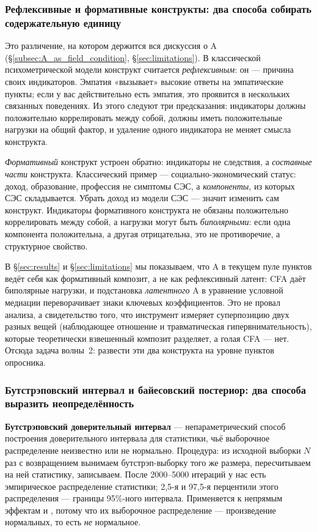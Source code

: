 \subsubsection{Рефлексивные и формативные конструкты: два способа собирать содержательную единицу}

Это различение, на котором держится вся дискуссия о A (§\ref{subsec:A_as_field_condition}, §\ref{sec:limitations}). В классической психометрической модели конструкт считается \emph{рефлексивным}: он --- причина своих индикаторов. Эмпатия «вызывает» высокие ответы на эмпатические пункты; если у вас действительно есть эмпатия, это проявится в нескольких связанных поведениях. Из этого следуют три предсказания: индикаторы должны положительно коррелировать между собой, должны иметь положительные нагрузки на общий фактор, и удаление одного индикатора не меняет смысла конструкта.

\emph{Формативный} конструкт устроен обратно: индикаторы не следствия, а \emph{составные части} конструкта. Классический пример --- социально-экономический статус: доход, образование, профессия не симптомы СЭС, а \emph{компоненты}, из которых СЭС складывается. Убрать доход из модели СЭС --- значит изменить сам конструкт. Индикаторы формативного конструкта не обязаны положительно коррелировать между собой, а нагрузки могут быть \emph{биполярными}: если одна компонента положительна, а другая отрицательна, это не противоречие, а структурное свойство.

В §\ref{sec:results} и §\ref{sec:limitations} мы показываем, что A в текущем пуле пунктов ведёт себя как формативный композит, а не как рефлексивный латент: CFA даёт биполярные нагрузки, и подстановка \emph{латентного} A в уравнение условной медиации переворачивает знаки ключевых коэффициентов. Это не провал анализа, а свидетельство того, что инструмент измеряет суперпозицию двух разных вещей (наблюдающее отношение и травматическая гипервнимательность), которые теоретически взвешенный композит разделяет, а голая CFA --- нет. Отсюда задача волны~2: развести эти два конструкта на уровне пунктов опросника.

\subsubsection{Бутстрэповский интервал и байесовский постериор: два способа выразить неопределённость}

\textbf{Бутстрэповский доверительный интервал} --- непараметрический способ построения доверительного интервала для статистики, чьё выборочное распределение неизвестно или не нормально. Процедура: из исходной выборки $N$ раз с возвращением вынимаем бутстрэп-выборку того же размера, пересчитываем на ней статистику, записываем. После 2000--5000 итераций у нас есть эмпирическое распределение статистики; 2{,}5-я и 97{,}5-я перцентили этого распределения --- границы 95\%-ного интервала. Применяется к непрямым эффектам и \IMM, потому что их выборочное распределение --- произведение нормальных, то есть \emph{не} нормальное.

